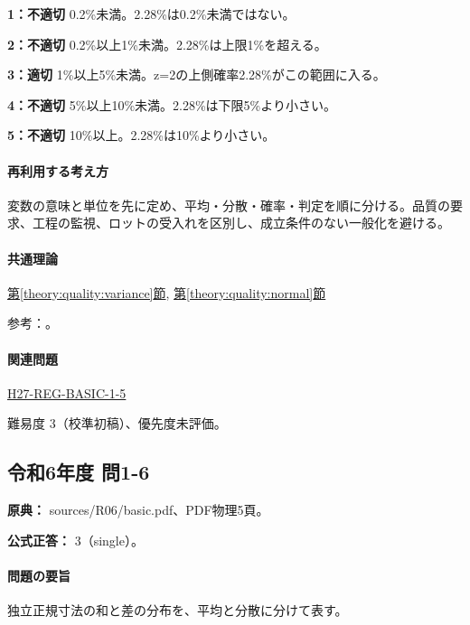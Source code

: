 \noindent\textbf{1：不適切} 0.2\%未満。2.28\%は0.2\%未満ではない。\par

\noindent\textbf{2：不適切} 0.2\%以上1\%未満。2.28\%は上限1\%を超える。\par

\noindent\textbf{3：適切} 1\%以上5\%未満。z=\allowbreak{}2の上側確率2.28\%がこの範囲に入る。\par

\noindent\textbf{4：不適切} 5\%以上10\%未満。2.28\%は下限5\%より小さい。\par

\noindent\textbf{5：不適切} 10\%以上。2.28\%は10\%より小さい。\par

\paragraph{再利用する考え方} 変数の意味と単位を先に定め、平均・分散・確率・判定を順に分ける。品質の要求、工程の監視、ロットの受入れを区別し、成立条件のない一般化を避ける。

\paragraph{共通理論} \hyperref[theory:quality:variance]{第\ref*{theory:quality:variance}節}, \hyperref[theory:quality:normal]{第\ref*{theory:quality:normal}節}

\par 参考：\cite{stat_nist_normal,stat_psu_linear}。

\paragraph{関連問題} \hyperref[q:h27-reg-basic-1-5]{H27-REG-BASIC-1-5}

\par 難易度 3（校準初稿）、優先度未評価。

\subsection{令和6年度 問1-6}
\label{q:r06-reg-basic-1-6}

\noindent\textbf{原典：} sources/R06/basic.pdf、PDF物理5頁。

\textbf{公式正答：} 3（single）。

\paragraph{問題の要旨} 独立正規寸法の和と差の分布を、平均と分散に分けて表す。

